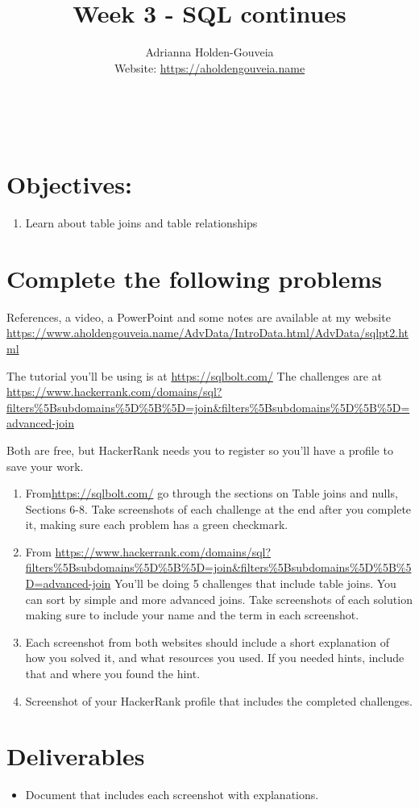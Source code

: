 \documentclass[12pt]{article}
\title{Week 3 - SQL continues}
\author{
        Adrianna Holden-Gouveia \\
        Website: \url{https://aholdengouveia.name}\\ 
        \date{\vspace{-5ex}}
        \faLinkedin{: aholdengouveia} \\
        \faGithub {: aholdengouveia} \\
        }
\begin{document}
    

\maketitle


\section*{Objectives:}
\begin{enumerate}
    \item Learn about table joins and table relationships
\end{enumerate}
\section*{Complete the following problems}

References, a video, a PowerPoint and some notes are available at my website
\url {https://www.aholdengouveia.name/AdvData/IntroData.html/AdvData/sqlpt2.html}

The tutorial you'll be using is at \url{https://sqlbolt.com/}
The challenges are at \url{https://www.hackerrank.com/domains/sql?filters%5Bsubdomains%5D%5B%5D=join&filters%5Bsubdomains%5D%5B%5D=advanced-join}

Both are free, but HackerRank needs you to register so you'll have a profile to save your work.

    \begin{enumerate}
        \item From\url{https://sqlbolt.com/} go through the sections on Table joins and nulls, Sections 6-8. Take screenshots of each challenge at the end after you complete it, making sure each problem has a green checkmark. 
        \item From \url{https://www.hackerrank.com/domains/sql?filters%5Bsubdomains%5D%5B%5D=join&filters%5Bsubdomains%5D%5B%5D=advanced-join} You'll be doing 5 challenges that include table joins.  You can sort by simple and more advanced joins. Take screenshots of each solution making sure to include your name and the term in each screenshot.
        \item Each screenshot from both websites should include a short explanation of how you solved it, and what resources you used.  If you needed hints, include that and where you found the hint. 
        \item Screenshot of your HackerRank profile that includes the completed challenges. 
    \end{enumerate}



\section*{Deliverables}
\begin{itemize}
    \item Document that includes each screenshot with explanations.
\end{itemize}
\end{document}
